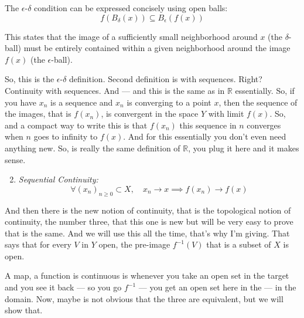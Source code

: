 \begin{math-stroke}
The $\epsilon$-$\delta$ condition can be expressed concisely using open balls:
\begin{equation} \label{eq:continuity_balls}
f(B_\delta(x)) \subseteq B_\epsilon(f(x))
\end{equation}
\begin{explanation-of-steps}
This states that the image of a sufficiently small neighborhood around $x$ (the $\delta$-ball) must be entirely contained within a given neighborhood around the image $f(x)$ (the $\epsilon$-ball).
\end{explanation-of-steps}
\end{math-stroke}

\begin{spoken-clean}[00:10:23 - 00:12:18]
So, this is the $\epsilon$-$\delta$ definition. Second definition is with sequences. Right? Continuity with sequences. And --- and this is the same as in $\mathbb{R}$ essentially. So, if you have $x_n$ is a sequence and $x_n$ is converging to a point $x$, then the sequence of the images, that is $f(x_n)$, is convergent in the space $Y$ with limit $f(x)$. So, and a compact way to write this is that $f(x_n)$ this sequence in $n$ converges when $n$ goes to infinity to $f(x)$. And for this essentially you don't even need anything new. So, is really the same definition of $\mathbb{R}$, you plug it here and it makes sense.
\end{spoken-clean}

\begin{math-stroke}
\begin{enumerate}
    \setcounter{enumi}{1} \item \emph{Sequential Continuity:}
    \[ \forall (x_n)_{n \ge 0} \subset X, \quad x_n \to x \implies f(x_n) \to f(x) \]
\end{enumerate}
\end{math-stroke}

\begin{spoken-clean}[00:12:18 - 00:14:15]
And then there is the new notion of continuity, that is the topological notion of continuity, the number three, that this one is new but will be very easy to prove that is the same. And we will use this all the time, that's why I'm giving. That says that for every $V$ in $Y$ open, the pre-image $f^{-1}(V)$ that is a subset of $X$ is open. 

A map, a function is continuous is whenever you take an open set in the target and you see it back --- so you go $f^{-1}$ --- you get an open set here in the --- in the domain. Now, maybe is not obvious that the three are equivalent, but we will show that.
\end{spoken-clean}

